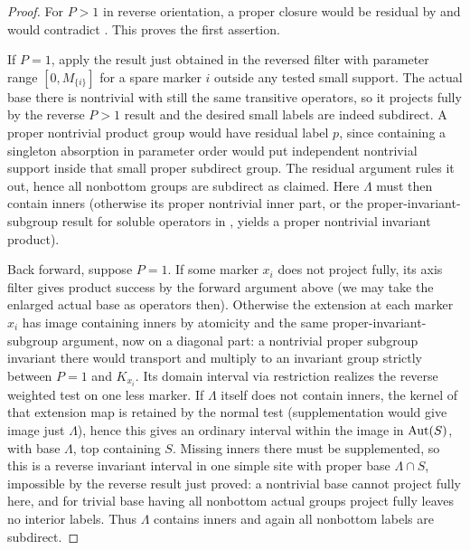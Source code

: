 \begin{proof}

For \(P>1\) in reverse orientation, a proper closure would be residual by
 and would contradict
.  This proves the first assertion.

If \(P=1\), apply the result just obtained in the reversed filter with parameter range
\([0,M_{\{i\}}]\) for a spare marker \(i\) outside any tested small support. The actual base there
is nontrivial with still the same transitive operators, so it projects fully by the reverse
\(P>1\) result and the desired small labels are indeed subdirect. A proper nontrivial product
group would have residual label \(p\), since containing a singleton absorption in parameter order
would put independent nontrivial support inside that small proper subdirect group. The residual
argument rules it out, hence all nonbottom groups are subdirect as claimed. Here \(\Lambda\) must
then contain inners (otherwise its proper nontrivial inner part, or the proper-invariant-subgroup
result for soluble operators in , yields a proper nontrivial invariant product).

Back forward, suppose \(P=1\). If some marker \(x_i\) does not project fully, its axis filter
gives product success by the forward argument above (we may take the enlarged actual base as
operators then). Otherwise the extension at each marker \(x_i\) has image containing inners by
atomicity and the same proper-invariant-subgroup argument, now on a diagonal part: a nontrivial
proper subgroup invariant there would transport and multiply to an invariant group strictly
between \(P=1\) and \(K_{x_i}\). Its domain interval via restriction realizes the reverse weighted
test on one less marker. If \(\Lambda\) itself does not contain inners, the kernel of that
extension map is retained by the normal test (supplementation would give image just \(\Lambda\)),
hence this gives an ordinary interval within the image in \({\rm Aut}(S)\), with base \(\Lambda\),
top containing \(S\). Missing inners there must be supplemented, so this is a reverse invariant
interval in one simple site with proper base \(\Lambda\cap S\), impossible by the reverse result
just proved: a nontrivial base cannot project fully here, and for trivial base having all
nonbottom actual groups project fully leaves no interior labels. Thus \(\Lambda\) contains inners
and again all nonbottom labels are subdirect.
\end{proof}

